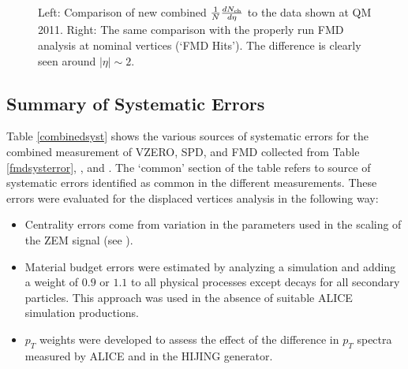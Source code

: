 \documentclass[11pt]{article}
\begin{document}
\begin{figure}
  \centering
  \begin{minipage}{0.5\linewidth}
    \centering
  \end{minipage}%
  \begin{minipage}{0.5\linewidth}
    \centering
  \end{minipage}%
  \caption{Left: Comparison of new combined $\dndeta$ to the data
    shown at QM 2011. Right: The same comparison with the properly run
    FMD analysis at nominal vertices (`FMD Hits'). The difference is
    clearly seen around $|\eta| \sim 2$.}
  \label{prelimcomparison}
\end{figure} 

\subsection{Summary of Systematic Errors}

Table \ref{combinedsyst} shows the various sources of systematic
errors for the combined measurement of VZERO, SPD, and FMD collected
from Table \ref{fmdsysterror}, \cite{maxime}, and
\cite{ruben,Aamodt:2010cz}. The `common' section of the table refers
to source of systematic errors identified as common in the different
measurements. These errors were evaluated for the displaced vertices
analysis in the following way:
\begin{itemize}
\item Centrality errors come from variation in the parameters used in
  the scaling of the ZEM signal (see \cite{maxime}).
\item Material budget errors were estimated by analyzing a simulation
  and adding a weight of $0.9$ or $1.1$ to all physical processes
  except decays for all secondary particles. This approach was used in
  the absence of suitable ALICE simulation productions.
\item $p_T$ weights were developed to assess the effect of the
  difference in $p_T$ spectra measured by ALICE and in the HIJING
  generator.
\end{itemize}
\end{document}
